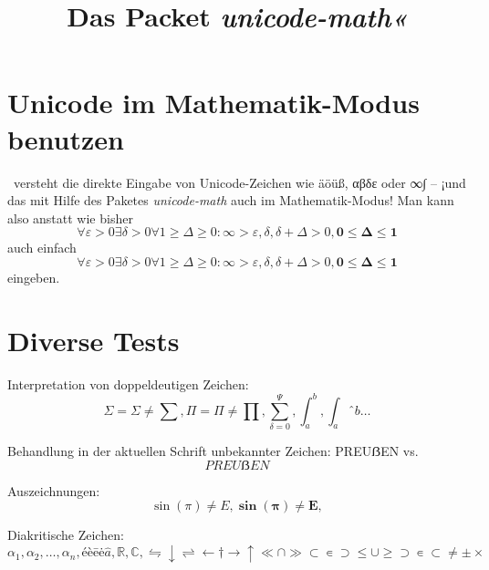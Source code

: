 \documentclass{article}
\begin{document}
\title{Das Packet \emph{unicode-math«}}


\section{Unicode im Mathematik-Modus benutzen}
\XeLaTeX\ versteht die direkte Eingabe von Unicode-Zeichen wie äöüß, αβδε oder ∞∫ – ¡und das mit Hilfe des Paketes \emph{unicode-math} auch im Mathematik-Modus! Man kann also anstatt wie bisher
\[ \forall \varepsilon>0 \exists \delta>0 \forall 1 \geq\Delta\geq0: \infty>\varepsilon,\delta,\delta+\Delta>0, \mathbf{0\leq\Delta\leq1} \]
auch einfach
\[ ∀ ε>0 ∃ δ>0 ∀1≥Δ≥0: ∞>ε,δ,δ+Δ>0, \mathbf{0≤Δ≤1} \]
eingeben.

\section{Diverse Tests}
Interpretation von doppeldeutigen Zeichen:
\[ Σ=\Sigma ≠ \sum, Π=\Pi ≠ \prod, \sum_{δ=0}^Ψ, ∫_a^b, \int_aˆb… \]

Behandlung in der aktuellen Schrift unbekannter Zeichen: PREUẞEN vs.
\[ PREUẞEN \]

Auszeichnungen:
\[ \sin(π) ≠ E, \mathbf{\sin(π) ≠ E,}  \]

Diakritische Zeichen:
\[ α_1, α_2, …, α_n, é è ē ė \hat{a}, ℝ, ℂ, ⇋↓⇌←†→↑≪∩≫⊂∊⊃≤∪≥⊃∊⊂≠±× \]
\end{document}
